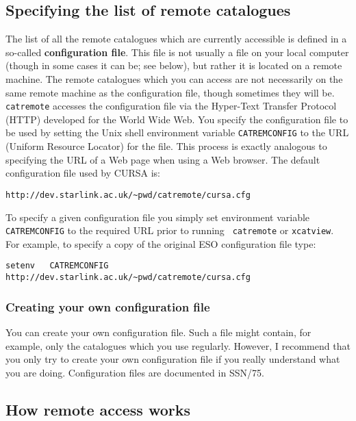 \documentclass[twoside,11pt]{article}
\newcommand{\xref}[3]{#1}
\renewcommand{\_}{\texttt{\symbol{95}}}
\begin{document}
\subsection{Specifying the list of remote catalogues  \label{REMCATS} }

The list of all the remote catalogues which are currently accessible
is defined in a so-called {\bf configuration file}.  This file is not
usually a file on your local computer (though in some cases it can be;
see below), but rather it is located on a remote machine.  The remote
catalogues which you can access are not necessarily on the same remote
machine as the configuration file, though sometimes they will be.  {\tt
catremote} accesses the configuration file via the Hyper-Text Transfer
Protocol (HTTP)  developed for the World Wide Web.  You specify the
configuration file to be used by setting the Unix shell environment
variable {\tt CATREM\_CONFIG} to the URL (Uniform Resource Locator)
for the file.  This process is exactly analogous to specifying the URL
of a Web page when using a Web browser.  The default configuration file
used by CURSA is:

\begin{center}
{\tt http://dev.starlink.ac.uk/\~{}pwd/catremote/cursa.cfg}
\end{center}

To specify a given configuration file you simply set environment
variable {\tt CATREM\_CONFIG} to the required URL prior to running {\tt
catremote} or {\tt xcatview}.  For example, to specify a copy of the
original ESO configuration file type:

\begin{center}
{\tt setenv ~ CATREM\_CONFIG ~ http://dev.starlink.ac.uk/\~{}pwd/catremote/cursa.cfg}
\end{center}

\subsubsection{Creating your own configuration file}

You can create your own configuration file.  Such a file might contain,
for example, only the catalogues which you use regularly.  However, I
recommend that you only try to create your own configuration file if you
really understand what you are doing.  Configuration files are documented
in \xref{SSN/75}{ssn75}{}\cite{SSN75}.

\subsection{How remote access works  \label{REMWORK} }
\end{document}
